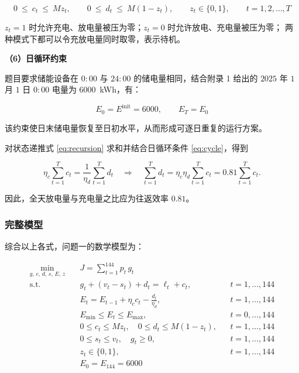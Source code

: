 \documentclass[withoutpreface,bwprint]{cumcmthesis}
\begin{document}
\begin{equation}
  0 \ \le\ c_t \ \le\ M z_t, \qquad
  0 \ \le\ d_t \ \le\ M(1-z_t), \qquad
  z_t \in \{0,1\}, \qquad t = 1,2,\dots,T
  \label{eq:mutex}
\end{equation}

$z_t = 1$ 时允许充电、放电量被压为零；$z_t = 0$ 时允许放电、充电量被压为零；
两种模式下都可以令充放电量同时取零，表示待机。

\textbf{（6）日循环约束}

题目要求储能设备在 $0{:}00$ 与 $24{:}00$ 的储电量相同，结合附录 1 给出的
$2025$ 年 $1$ 月 $1$ 日 $0{:}00$ 电量为 $6000$~kWh，有：

\begin{equation}
  E_0 = E^{\mathrm{init}} = 6000, \qquad E_T = E_0
  \label{eq:cycle}
\end{equation}

该约束使日末储电量恢复至日初水平，从而形成可逐日重复的运行方案。

对状态递推式 \eqref{eq:recursion} 求和并结合日循环条件 \eqref{eq:cycle}，得到

\begin{equation}
  \eta_c \sum_{t=1}^{T} c_t = \frac{1}{\eta_d}\sum_{t=1}^{T} d_t
  \quad\Longrightarrow\quad
  \sum_{t=1}^{T} d_t = \eta_c\eta_d \sum_{t=1}^{T} c_t = 0.81 \sum_{t=1}^{T} c_t .
  \label{eq:cycle-check}
\end{equation}

因此，全天放电量与充电量之比应为往返效率 $0.81$。

\subsubsection{完整模型}

综合以上各式，问题一的数学模型为：

\begin{equation}
\begin{aligned}
  \min_{g,\,c,\,d,\,s,\,E,\,z} \quad & J = \sum_{t=1}^{144} p_t\, g_t \\[2pt]
  \text{s.t.} \quad
  & g_t + (v_t - s_t) + d_t = \ell_t + c_t, && t = 1,\dots,144 \\
  & E_t = E_{t-1} + \eta_c c_t - \frac{d_t}{\eta_d}, && t = 1,\dots,144 \\
  & E_{\min} \le E_t \le E_{\max}, && t = 0,\dots,144 \\
  & 0 \le c_t \le M z_t, \quad 0 \le d_t \le M(1-z_t), && t = 1,\dots,144 \\
  & 0 \le s_t \le v_t, \quad g_t \ge 0, && t = 1,\dots,144 \\
  & z_t \in \{0,1\}, && t = 1,\dots,144 \\
  & E_0 = E_{144} = 6000
\end{aligned}
\label{eq:full-model}
\end{equation}
\end{document}
